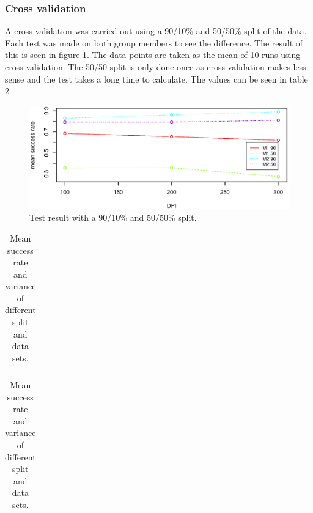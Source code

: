\subsubsection{Cross validation}
A cross validation was carried out using a 90/10\% and 50/50\% split of the data. 
Each test was made on both group members to see the difference.
The result of this is seen in figure \ref{fig:PersonDependent_9010}.
The data points are taken as the mean of 10 runs using cross validation.
The 50/50 split is only done once as cross validation makes less sense and the test takes a long time to calculate.
The values can be seen in table \ref{tb:cross}

\begin{figure}[h]
\centering
\includegraphics[width=\textwidth]{graphics/cross_test}
\caption[Cross validation]{Test result with a 90/10\% and 50/50\% split. }
\label{fig:PersonDependent_9010}
\end{figure}

\begin{table}[h]
\centering
    \begin{subtable}[b]{0.56\textwidth}
    \centering
        \begin{tabular}{lcccccc}
            
        \end{tabular}
        \caption{Mean success rate.}
    \end{subtable}
    \begin{subtable}[b]{0.48\textwidth}
    \centering
        \begin{tabular}{lcccccc}
            
        \end{tabular}
        \caption{Variance in success rate.}
    \end{subtable}
    \caption[Success of functions.]{Mean success rate and variance of different split and data sets.}
    \label{tb:cross}
\end{table}




